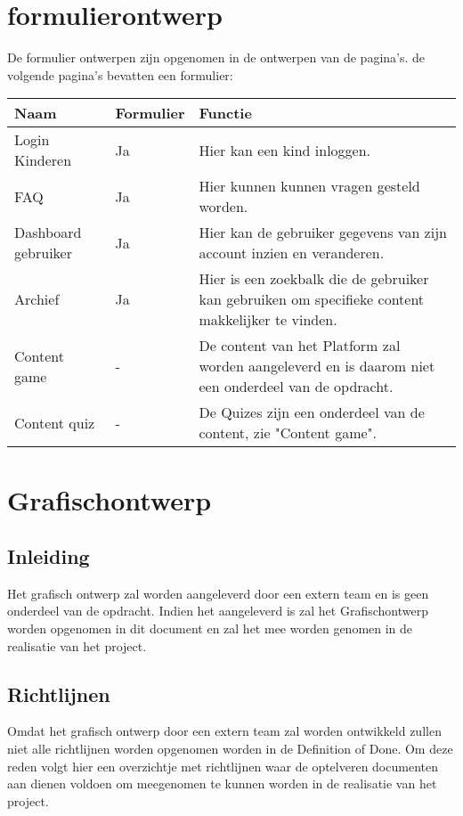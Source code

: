 \documentclass[]{report}
\begin{document}
\chapter{formulierontwerp}

De formulier ontwerpen zijn opgenomen in de ontwerpen van de pagina's.
de volgende pagina's bevatten een formulier: 

\begin{tabular}{ l l p{6cm} }
	\textbf{Naam} & \textbf{Formulier} & \textbf{Functie} \\ \hline
	Login Kinderen 		& Ja		& Hier kan een kind inloggen. \\
	FAQ 				& Ja 		& Hier kunnen kunnen vragen gesteld worden. \\
	Dashboard gebruiker	& Ja		& Hier kan de gebruiker gegevens van zijn account inzien en veranderen. \\
	Archief 			& Ja		& Hier is een zoekbalk die de gebruiker kan gebruiken om specifieke content makkelijker te vinden. \\
	Content game 		& - 		& De content van het Platform zal worden aangeleverd en is daarom niet een onderdeel van de opdracht. \\
	Content quiz 		& - 		& De Quizes zijn een onderdeel van de content, zie "Content game". \\
\end{tabular}






\chapter{Grafischontwerp}

\section{Inleiding}
Het grafisch ontwerp zal worden aangeleverd door een extern team en is geen onderdeel van de opdracht. Indien het aangeleverd is zal het Grafischontwerp worden opgenomen in dit document en zal het mee worden genomen in de realisatie van het project.

\section{Richtlijnen}
Omdat het grafisch ontwerp door een extern team zal worden ontwikkeld zullen niet alle richtlijnen worden opgenomen worden in de Definition of Done. Om deze reden volgt hier een overzichtje met richtlijnen waar de optelveren documenten aan dienen voldoen om meegenomen te kunnen worden in de realisatie van het project.
\end{document}
